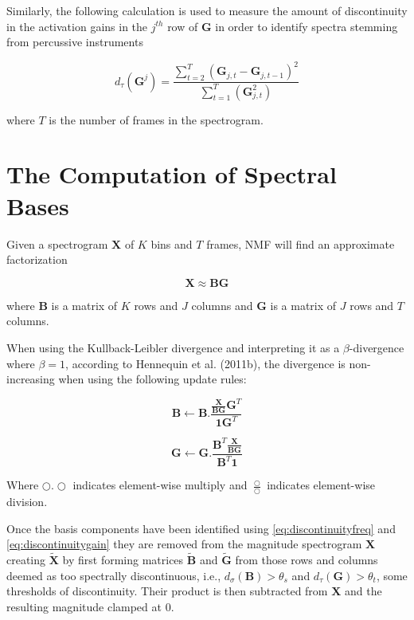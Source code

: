 \documentclass[72pt]{article}
\begin{document}
\begin{Huge}
\newpage

Similarly, the following calculation is used to measure the amount of
discontinuity in the activation gains in the \( j^{th} \) row of \(
\mathbf{G} \) in order to identify spectra stemming from percussive instruments

\begin{equation} \label{eq:discontinuitygain}
d_\tau(\mathbf{G}^j) =
\frac{\sum\limits_{t=2}^{T}(\mathbf{G}_{j,t}-\mathbf{G}_{j,t-1})^2}{
    \sum\limits_{t=1}^{T}(\mathbf{G}_{j,t}^{2})}
\end{equation}

where \( T \) is the number of frames in the spectrogram.

\newpage

\section*{The Computation of Spectral Bases}
Given a spectrogram \( \mathbf{X} \) of \( K \) bins and \( T \) frames, NMF
will find an approximate factorization

\[ \mathbf{X} \approx \mathbf{B}\mathbf{G} \]

where \( \mathbf{B} \) is a matrix of \( K \) rows and \( J \) columns and \(
\mathbf{G} \) is a matrix of \( J \) rows and \( T \) columns.

\newpage

When using the Kullback-Leibler divergence and interpreting it as a
\(\beta\)-divergence where \(\beta = 1 \), according to Hennequin et al.
(2011b), the divergence is non-increasing when using the following update rules:

\[ \mathbf{B} \gets
\mathbf{B}.\frac{\frac{\mathbf{X}}{\mathbf{B}\mathbf{G}}\mathbf{G}^T}
    {\mathbf{1}\mathbf{G}^T}
\]

\[ \mathbf{G} \gets
\mathbf{G}.\frac{\mathbf{B}^T\frac{\mathbf{X}}{\mathbf{B}\mathbf{G}}}
    {\mathbf{B}^{T}\mathbf{1}}
\]

Where \( \bigcirc.\bigcirc \) indicates element-wise multiply and \( \frac{\bigcirc}{\bigcirc} \) indicates
element-wise division.

\newpage

Once the basis components have been identified using
\eqref{eq:discontinuityfreq} and \eqref{eq:discontinuitygain} they are removed
from the magnitude spectrogram \( \mathbf{X} \) creating \( \tilde{\mathbf{X}} \) by
first forming matrices \( \tilde{\mathbf{B}} \) and \( \tilde{\mathbf{G}} \) from those rows and
columns deemed as too spectrally discontinuous, i.e., \( d_\sigma(\mathbf{B}) >
\theta_s \) and \( d_\tau(\mathbf{G}) > \theta_t \), some thresholds of
discontinuity. Their product is then subtracted from \( \mathbf{X} \) and the
resulting magnitude clamped at 0.


\end{Huge}
\end{document}
